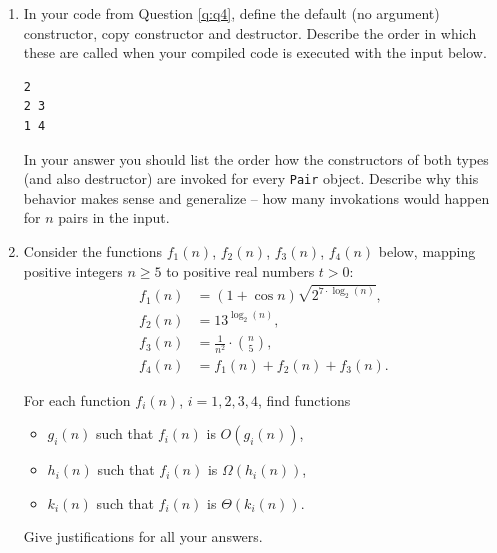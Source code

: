 \documentclass[a4paper,12pt]{article}
\begin{document}
\begin{enumerate}
{\bf Sample input}

\begin{Verbatim}[frame=single]
5
4 17
4 17
5 1000
7 12
7 9
\end{Verbatim}

{\bf Sample output}

\begin{Verbatim}[frame=single]
(4,17)
(5,1000)
(7,12)
\end{Verbatim}

\clearpage

\item 
In your code from Question \ref{q:q4}, define the default (no argument) constructor, copy constructor 
and destructor. Describe the order in which these are called when your compiled code is executed with the input below.

\begin{Verbatim}[frame=single]
2
2 3
1 4
\end{Verbatim}

In your answer you should list the order how the constructors of both types (and also destructor)
are invoked for every {\tt Pair} object. Describe why this behavior makes sense 
and generalize -- how many invokations would happen for $n$ pairs in the input.


\vspace{1cm}

\item

Consider the functions $f_1(n)$, $f_2(n)$, $f_3(n)$, $f_4(n)$ below, mapping positive integers $n \geq 5$
to positive real numbers $t>0$: 
% 
\begin{align*}
f_1(n) & = (1 + \cos n) \sqrt{2^{7 \cdot \log_2 (n)}},\\
f_2(n) & = 13^{\log_2 (n)},\\
f_3(n) & = \frac{1}{n^2} \cdot {n \choose 5},\\
f_4(n) & = f_1(n) + f_2(n) + f_3(n).
\end{align*}

For each function $f_i(n)$, $i=1,2,3,4$, find functions 
\begin{itemize}
\item $g_i(n)$ such that $f_i(n)$ is $O(g_i(n))$,
\item $h_i(n)$ such that $f_i(n)$ is $\Omega(h_i(n))$, 
\item $k_i(n)$ such that $f_i(n)$ is $\Theta(k_i(n))$. 
\end{itemize}
Give justifications for all your answers.


\end{enumerate}
\end{document}
